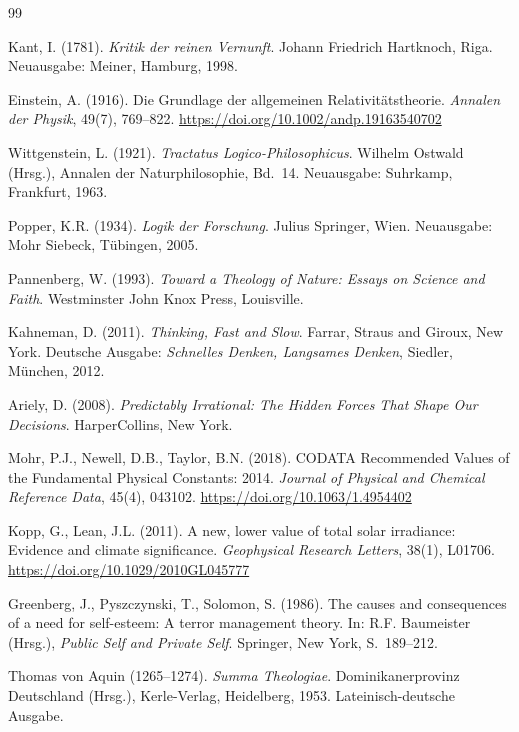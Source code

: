 ﻿\documentclass[a4paper,12pt]{article}
\theoremstyle{definition}
\begin{document}
\newpage
\begin{thebibliography}{99}

Kant, I. (1781). \textit{Kritik der reinen Vernunft}. Johann Friedrich Hartknoch, Riga. Neuausgabe: Meiner, Hamburg, 1998.

Einstein, A. (1916). Die Grundlage der allgemeinen Relativitätstheorie. \textit{Annalen der Physik}, 49(7), 769--822. \url{https://doi.org/10.1002/andp.19163540702}

Wittgenstein, L. (1921). \textit{Tractatus Logico-Philosophicus}. Wilhelm Ostwald (Hrsg.), Annalen der Naturphilosophie, Bd.~14. Neuausgabe: Suhrkamp, Frankfurt, 1963.

Popper, K.R. (1934). \textit{Logik der Forschung}. Julius Springer, Wien. Neuausgabe: Mohr Siebeck, Tübingen, 2005.

Pannenberg, W. (1993). \textit{Toward a Theology of Nature: Essays on Science and Faith}. Westminster John Knox Press, Louisville.

Kahneman, D. (2011). \textit{Thinking, Fast and Slow}. Farrar, Straus and Giroux, New York. Deutsche Ausgabe: \textit{Schnelles Denken, Langsames Denken}, Siedler, München, 2012.

Ariely, D. (2008). \textit{Predictably Irrational: The Hidden Forces That Shape Our Decisions}. HarperCollins, New York.

Mohr, P.J., Newell, D.B., Taylor, B.N. (2018). CODATA Recommended Values of the Fundamental Physical Constants: 2014. \textit{Journal of Physical and Chemical Reference Data}, 45(4), 043102. \url{https://doi.org/10.1063/1.4954402}

Kopp, G., Lean, J.L. (2011). A new, lower value of total solar irradiance: Evidence and climate significance. \textit{Geophysical Research Letters}, 38(1), L01706. \url{https://doi.org/10.1029/2010GL045777}

Greenberg, J., Pyszczynski, T., Solomon, S. (1986). The causes and consequences of a need for self-esteem: A terror management theory. In: R.F. Baumeister (Hrsg.), \textit{Public Self and Private Self}. Springer, New York, S.~189--212.

Thomas von Aquin (1265--1274). \textit{Summa Theologiae}. Dominikanerprovinz Deutschland (Hrsg.), Kerle-Verlag, Heidelberg, 1953. Lateinisch-deutsche Ausgabe.


\end{thebibliography}
\end{document}
